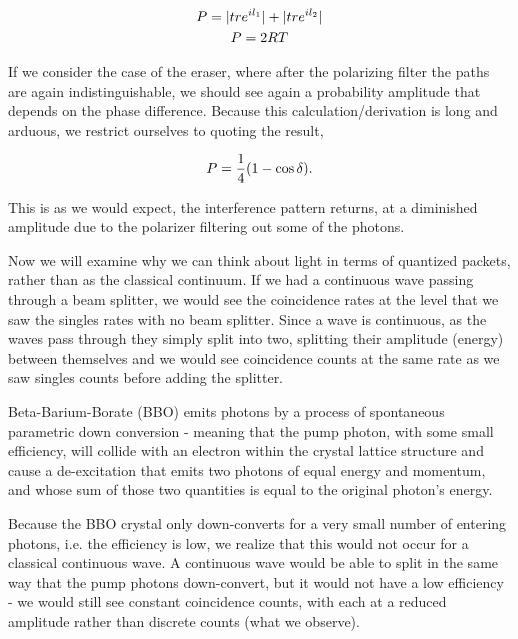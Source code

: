 \documentclass{article}
\DeclarePairedDelimiter\abs{\lvert}{\rvert}%
\DeclarePairedDelimiter{\parens}{\lparen}{\rparen}
\begin{document}
	\begin{gather}
		P = \abs{tre^{il_1}} + \abs{tre^{il_2}} \\
		P = 2RT
	\end{gather}

	If we consider the case of the eraser, where after the polarizing filter the paths are again indistinguishable, we should see again a probability amplitude that depends on the phase difference.  Because this calculation/derivation is long and arduous, we restrict ourselves to quoting the result, 

	\begin{equation}
		P = \frac{1}{4}\parens*{1-\cos{\delta}}.
	\end{equation}

	This is as we would expect, the interference pattern returns, at a diminished amplitude due to the polarizer filtering out some of the photons.

	\hspace{.25cm}

	Now we will examine why we can think about light in terms of quantized packets, rather than as the classical continuum.  If we had a continuous wave passing through a beam splitter, we would see the coincidence rates at the level that we saw the singles rates with no beam splitter.  Since a wave is continuous, as the waves pass through they simply split into two, splitting their amplitude (energy) between themselves and we would see coincidence counts at the same rate as we saw singles counts before adding the splitter.

	\hspace{.25cm}
	Beta-Barium-Borate (BBO) emits photons by a process of spontaneous parametric down conversion - meaning that the pump photon, with some small efficiency, will collide with an electron within the crystal lattice structure and cause a de-excitation that emits two photons of equal energy and momentum, and whose sum of those two quantities is equal to the original photon's energy.

	\hspace{.25cm}

	Because the BBO crystal only down-converts for a very small number of entering photons, i.e. the efficiency is low, we realize that this would not occur for a classical continuous wave.  A continuous wave would be able to split in the same way that the pump photons down-convert, but it would not have a low efficiency - we would still see constant coincidence counts, with each at a reduced amplitude rather than discrete counts (what we observe).
\end{document}
